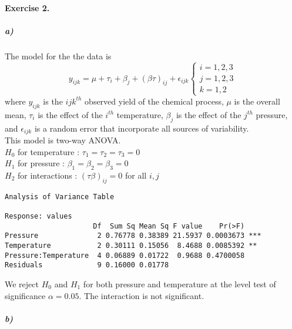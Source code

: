 \documentclass{article}
\begin{document}
\paragraph{Exercise 2.}
\subparagraph{a)}
The model for the the data is $$
y_{ijk}=\mu +\tau_i+\beta_j+ (\beta\tau)_{ij} +\epsilon_{ijk} \left \{
    \begin{array}{ll}
        i=1,2,3 \\
		j=1,2,3 \\
		k=1,2
    \end{array}
\right.
$$
where $y_{ijk}$ is the $ijk^{th}$ observed yield of the chemical process, $\mu$ is the overall mean, $\tau_i$ is the effect of the $i^{th}$ temperature, $\beta_j$ is the effect of the $j^{th}$ pressure, and $\epsilon_{ijk}$ is a random error that incorporate all sources of variability.\\

This model is two-way ANOVA. \\
$H_0$ for temperature : $ \tau_1 = \tau_2 = \tau_3 =0$\\
$H_1$ for pressure : $ \beta_1 = \beta_2=\beta_3=0$\\
$H_2$ for interactions : $(\tau\beta)_{ij}=0$ for all $i,j$
\begin{verbatim}
Analysis of Variance Table

Response: values
                     Df  Sum Sq Mean Sq F value    Pr(>F)    
Pressure              2 0.76778 0.38389 21.5937 0.0003673 ***
Temperature           2 0.30111 0.15056  8.4688 0.0085392 ** 
Pressure:Temperature  4 0.06889 0.01722  0.9688 0.4700058    
Residuals             9 0.16000 0.01778                      
\end{verbatim}
We reject $H_0$ and $H_1$ for both pressure and temperature at the level test of significance $\alpha=0.05$. The interaction is not significant. \\
\subparagraph{b)}
\end{document}
